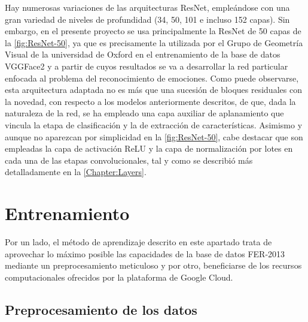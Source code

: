 Hay numerosas variaciones de las arquitecturas ResNet, empleándose con una gran variedad de niveles de profundidad (34, 50, 101 e incluso 152 capas). Sin embargo, en el presente proyecto se usa principalmente la ResNet de 50 capas de la \autoref{fig:ResNet-50}, ya que es precisamente la utilizada por el Grupo de Geometría Visual de la universidad de Oxford en el entrenamiento de la base de datos VGGFace2 \cite{VGGFace2} y a partir de cuyos resultados se va a desarrollar la red particular enfocada al problema del reconocimiento de emociones. Como puede observarse, esta arquitectura adaptada no es más que una sucesión de bloques residuales con la novedad, con respecto a los modelos anteriormente descritos, de que, dada la naturaleza de la red, se ha empleado una capa auxiliar de aplanamiento que vincula la etapa de clasificación y la de extracción de características. Asimismo y aunque no aparezcan por simplicidad en la \autoref{fig:ResNet-50}, cabe destacar que son empleadas la capa de activación ReLU y la capa de normalización por lotes en cada una de las etapas convolucionales, tal y como se describió más detalladamente en la \autoref{Chapter:Layers}.

\section{Entrenamiento}

Por un lado, el método de aprendizaje descrito en este apartado trata de aprovechar lo máximo posible las capacidades de la base de datos FER-2013 mediante un preprocesamiento meticuloso y por otro, beneficiarse de los recursos computacionales ofrecidos por la plataforma de Google Cloud.

\subsection{Preprocesamiento de los datos}

